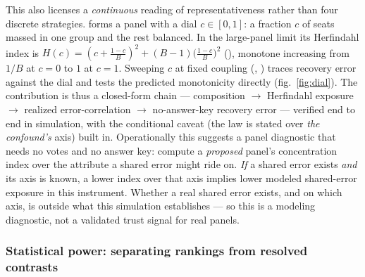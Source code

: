 \documentclass[
]{article}
\begin{document}
This also licenses a \emph{continuous} reading of representativeness
rather than four discrete strategies.
 forms a panel with a dial
\(c\in[0,1]\): a fraction \(c\) of seats massed in one group and the
rest balanced. In the large-panel limit its Herfindahl index is
\(H(c) = (c + \tfrac{1-c}{B})^2 + (B-1)\big(\tfrac{1-c}{B}\big)^2\)
(), monotone increasing from
\(1/B\) at \(c=0\) to \(1\) at \(c=1\). Sweeping \(c\) at fixed coupling
(,
) traces recovery error
against the dial and tests the predicted monotonicity directly
(fig.~\ref{fig:dial}). The contribution is thus a closed-form chain ---
composition \(\to\) Herfindahl exposure \(\to\) realized
error-correlation \(\to\) no-answer-key recovery error --- verified end
to end in simulation, with the conditional caveat (the law is stated
over \emph{the confound's} axis) built in. Operationally this suggests a
panel diagnostic that needs no votes and no answer key: compute a
\emph{proposed} panel's concentration index over the attribute a shared
error might ride on. \emph{If} a shared error exists \emph{and} its axis
is known, a lower index over that axis implies lower modeled
shared-error exposure in this instrument. Whether a real shared error
exists, and on which axis, is outside what this simulation establishes
--- so this is a modeling diagnostic, not a validated trust signal for
real panels.

\subsubsection{Statistical power: separating rankings from resolved
contrasts}\label{statistical-power-separating-rankings-from-resolved-contrasts}
\end{document}
